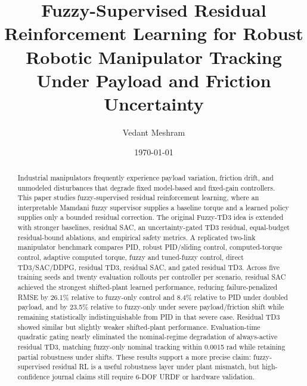 \documentclass[reprint,amsmath,amssymb,aps,pra]{revtex4-2}
\begin{document}
\title{Fuzzy-Supervised Residual Reinforcement Learning for Robust Robotic Manipulator Tracking Under Payload and Friction Uncertainty}

\author{Vedant Meshram}

\date{\today}

\begin{abstract}
Industrial manipulators frequently experience payload variation, friction drift, and unmodeled disturbances that degrade fixed model-based and fixed-gain controllers. This paper studies fuzzy-supervised residual reinforcement learning, where an interpretable Mamdani fuzzy supervisor supplies a baseline torque and a learned policy supplies only a bounded residual correction. The original Fuzzy-TD3 idea is extended with stronger baselines, residual SAC, an uncertainty-gated TD3 residual, equal-budget residual-bound ablations, and empirical safety metrics. A replicated two-link manipulator benchmark compares PID, robust PID/sliding control, computed-torque control, adaptive computed torque, fuzzy and tuned-fuzzy control, direct TD3/SAC/DDPG, residual TD3, residual SAC, and gated residual TD3. Across five training seeds and twenty evaluation rollouts per controller per scenario, residual SAC achieved the strongest shifted-plant learned performance, reducing failure-penalized RMSE by 26.1\% relative to fuzzy-only control and 8.4\% relative to PID under doubled payload, and by 23.5\% relative to fuzzy-only under severe payload/friction shift while remaining statistically indistinguishable from PID in that severe case. Residual TD3 showed similar but slightly weaker shifted-plant performance. Evaluation-time quadratic gating nearly eliminated the nominal-regime degradation of always-active residual TD3, matching fuzzy-only nominal tracking within 0.0015 rad while retaining partial robustness under shifts. These results support a more precise claim: fuzzy-supervised residual RL is a useful robustness layer under plant mismatch, but high-confidence journal claims still require 6-DOF URDF or hardware validation.
\end{abstract}

\maketitle
\end{document}

